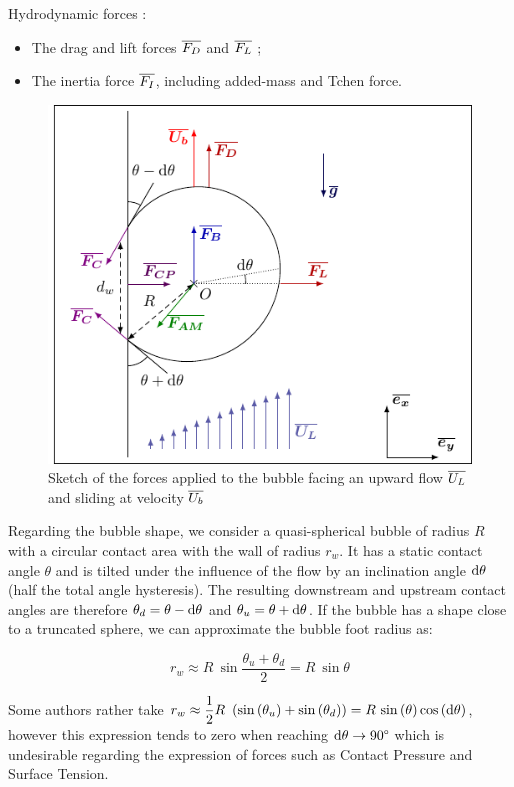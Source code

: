 Hydrodynamic forces :

\begin{itemize}
\item The drag and lift forces $\overline{F_{D}}$ and $\overline{F_{L}}$ ;
\item The inertia force $\overline{F_{I}}$, including added-mass and Tchen force.
\end{itemize}



\begin{figure}[h!]
\centering
%
\includegraphics[width=0.6\linewidth]{img/forces/bub_bdf.pdf}
\caption{Sketch of the forces applied to the bubble facing an upward flow $\overline{U_{L}}$ and sliding at velocity $\overline{U_{b}}$}
\label{fig:bub_forces}
\end{figure}



Regarding the bubble shape, we consider a quasi-spherical bubble of radius $R$ with a circular contact area with the wall of radius $r_{w}$. It has a static contact angle $\theta$ and is tilted under the influence of the flow by an inclination angle $\mathrm{d}\theta$ (half the total angle hysteresis). The resulting downstream and upstream contact angles are therefore $\theta_{d}=\theta-\mathrm{d}\theta$ and $\theta_{u}=\theta+\mathrm{d}\theta$. If the bubble has a shape close to a truncated sphere, we can approximate the bubble foot radius as:

\begin{equation}
r_{w} \approx R~ \sin{\frac{\theta_{u}+\theta_{d}}{2}}=R~ \sin{\theta}
\label{eq:rw}
\end{equation}

Some authors rather take $r_{w}\approx \dfrac{1}{2} R~\left( \mathrm{sin}\left( \theta_{u} \right) + \mathrm{sin}\left( \theta_{d} \right)  \right)=R~\mathrm{sin}\left( \theta \right)\mathrm{cos}\left( \mathrm{d}\theta \right)$, however this expression tends to zero when reaching $\mathrm{d}\theta \to 90\degree$ which is undesirable regarding the expression of forces such as Contact Pressure and Surface Tension.


